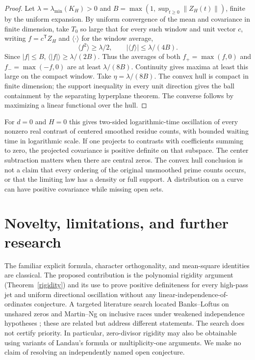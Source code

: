 \documentclass[11pt]{article}
\theoremstyle{remark}\newtheorem{remark}[theorem]{Remark}
\begin{document}
\begin{proof}
Let $\lambda=\lambda_{\min}(K_H)>0$ and $B=\max(1,\sup_{t\ge0}\|Z_H(t)\|)$, finite by the uniform expansion. By uniform convergence of the mean and covariance in finite dimension, take $T_0$ so large that for every such window and unit vector $c$, writing $f=c^{\mathsf T}Z_H$ and $\langle\cdot\rangle$ for the window average,
\[
 \langle f^2\rangle\ge \lambda/2,\qquad |\langle f\rangle|\le\lambda/(4B).
\]
Since $|f|\le B$, $\langle|f|\rangle\ge\lambda/(2B)$. Thus the averages of both $f_+=\max(f,0)$ and $f_-=\max(-f,0)$ are at least $\lambda/(8B)$. Continuity gives maxima at least this large on the compact window. Take $\eta=\lambda/(8B)$. The convex hull is compact in finite dimension; the support inequality in every unit direction gives the ball containment by the separating hyperplane theorem. The converse follows by maximizing a linear functional over the hull.
\end{proof}
For $d=0$ and $H=0$ this gives two-sided logarithmic-time oscillation of every nonzero real contrast of centered smoothed residue counts, with bounded waiting time in logarithmic scale. If one projects to contrasts with coefficients summing to zero, the projected covariance is positive definite on that subspace. The center subtraction matters when there are central zeros. The convex hull conclusion is not a claim that every ordering of the original unsmoothed prime counts occurs, or that the limiting law has a density or full support. A distribution on a curve can have positive covariance while missing open sets.

\section{Novelty, limitations, and further research}
The familiar explicit formula, character orthogonality, and mean-square identities are classical. The proposed contribution is the polynomial rigidity argument (Theorem~\ref{rigidity}) and its use to prove positive definiteness for every high-pass jet and uniform directional oscillation without any linear-independence-of-ordinates conjecture. A targeted literature search located Banks--Loftus on unshared zeros \cite{banks} and Martin--Ng on inclusive races under weakened independence hypotheses \cite{martin}; these are related but address different statements. The search does not certify priority. In particular, zero-divisor rigidity may also be obtainable using variants of Landau's formula or multiplicity-one arguments. We make no claim of resolving an independently named open conjecture.
\end{document}
